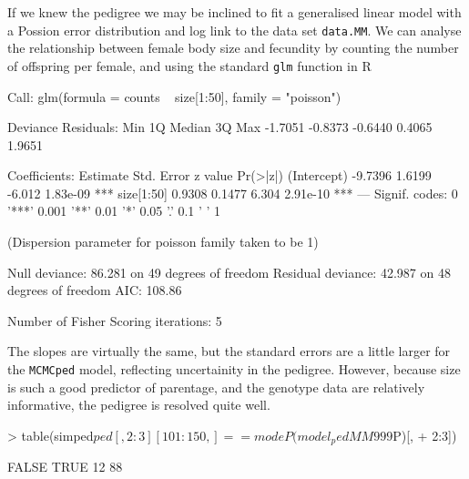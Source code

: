 \documentclass{article}
\begin{document}
 If we knew the pedigree we may be inclined to fit a generalised linear model with a Possion error distribution and log link to the data set \texttt{data.MM}.  We can analyse the relationship between female body size and fecundity by counting the number of offspring per female, and using the standard \texttt{glm} function in R 

\begin{Schunk}
\begin{Soutput}
Call:
glm(formula = counts ~ size[1:50], family = "poisson")

Deviance Residuals: 
    Min       1Q   Median       3Q      Max  
-1.7051  -0.8373  -0.6440   0.4065   1.9651  

Coefficients:
            Estimate Std. Error z value Pr(>|z|)    
(Intercept)  -9.7396     1.6199  -6.012 1.83e-09 ***
size[1:50]    0.9308     0.1477   6.304 2.91e-10 ***
---
Signif. codes:  0 '***' 0.001 '**' 0.01 '*' 0.05 '.' 0.1 ' ' 1 

(Dispersion parameter for poisson family taken to be 1)

    Null deviance: 86.281  on 49  degrees of freedom
Residual deviance: 42.987  on 48  degrees of freedom
AIC: 108.86

Number of Fisher Scoring iterations: 5
\end{Soutput}
\end{Schunk}

The slopes are virtually the same,  but the standard errors are a little larger for the \texttt{MCMCped} model, reflecting uncertainity in the pedigree.  However, because size is such a good predictor of parentage, and the genotype data are relatively informative, the pedigree is resolved quite well.

\begin{Schunk}
\begin{Sinput}
> table(simped$ped[, 2:3][101:150, ] == modeP(model_pedMM999$P)[, 
+     2:3])
\end{Sinput}
\begin{Soutput}
FALSE  TRUE 
   12    88 
\end{Soutput}
\end{Schunk}
\end{document}
